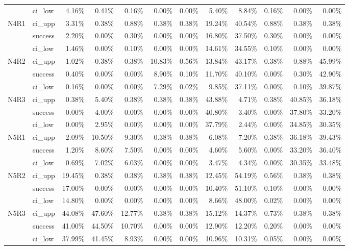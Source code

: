 \begin{tabular}{llrrrrrrrrrr}
     & ci\_low &       4.16\% &  0.41\% &  0.16\% &  0.00\% &  0.00\% &        5.40\% &  8.84\% & 0.16\% &  0.00\% &  0.00\% \\
N4R1 & ci\_upp &       3.31\% &  0.38\% &  0.88\% &  0.38\% &  0.38\% &       19.24\% & 40.54\% & 0.88\% &  0.38\% &  0.38\% \\
     & success &       2.20\% &  0.00\% &  0.30\% &  0.00\% &  0.00\% &       16.80\% & 37.50\% & 0.30\% &  0.00\% &  0.00\% \\
     & ci\_low &       1.46\% &  0.00\% &  0.10\% &  0.00\% &  0.00\% &       14.61\% & 34.55\% & 0.10\% &  0.00\% &  0.00\% \\
N4R2 & ci\_upp &       1.02\% &  0.38\% &  0.38\% & 10.83\% &  0.56\% &       13.84\% & 43.17\% & 0.38\% &  0.88\% & 45.99\% \\
     & success &       0.40\% &  0.00\% &  0.00\% &  8.90\% &  0.10\% &       11.70\% & 40.10\% & 0.00\% &  0.30\% & 42.90\% \\
     & ci\_low &       0.16\% &  0.00\% &  0.00\% &  7.29\% &  0.02\% &        9.85\% & 37.11\% & 0.00\% &  0.10\% & 39.87\% \\
N4R3 & ci\_upp &       0.38\% &  5.40\% &  0.38\% &  0.38\% &  0.38\% &       43.88\% &  4.71\% & 0.38\% & 40.85\% & 36.18\% \\
     & success &       0.00\% &  4.00\% &  0.00\% &  0.00\% &  0.00\% &       40.80\% &  3.40\% & 0.00\% & 37.80\% & 33.20\% \\
     & ci\_low &       0.00\% &  2.95\% &  0.00\% &  0.00\% &  0.00\% &       37.79\% &  2.44\% & 0.00\% & 34.85\% & 30.35\% \\
N5R1 & ci\_upp &       2.09\% & 10.50\% &  9.30\% &  0.38\% &  0.38\% &        6.08\% &  7.20\% & 0.38\% & 36.18\% & 39.43\% \\
     & success &       1.20\% &  8.60\% &  7.50\% &  0.00\% &  0.00\% &        4.60\% &  5.60\% & 0.00\% & 33.20\% & 36.40\% \\
     & ci\_low &       0.69\% &  7.02\% &  6.03\% &  0.00\% &  0.00\% &        3.47\% &  4.34\% & 0.00\% & 30.35\% & 33.48\% \\
N5R2 & ci\_upp &      19.45\% &  0.38\% &  0.38\% &  0.38\% &  0.38\% &       12.45\% & 54.19\% & 0.56\% &  0.38\% &  0.38\% \\
     & success &      17.00\% &  0.00\% &  0.00\% &  0.00\% &  0.00\% &       10.40\% & 51.10\% & 0.10\% &  0.00\% &  0.00\% \\
     & ci\_low &      14.80\% &  0.00\% &  0.00\% &  0.00\% &  0.00\% &        8.66\% & 48.00\% & 0.02\% &  0.00\% &  0.00\% \\
N5R3 & ci\_upp &      44.08\% & 47.60\% & 12.77\% &  0.38\% &  0.38\% &       15.12\% & 14.37\% & 0.73\% &  0.38\% &  0.38\% \\
     & success &      41.00\% & 44.50\% & 10.70\% &  0.00\% &  0.00\% &       12.90\% & 12.20\% & 0.20\% &  0.00\% &  0.00\% \\
     & ci\_low &      37.99\% & 41.45\% &  8.93\% &  0.00\% &  0.00\% &       10.96\% & 10.31\% & 0.05\% &  0.00\% &  0.00\% \\
\bottomrule
\end{tabular}

